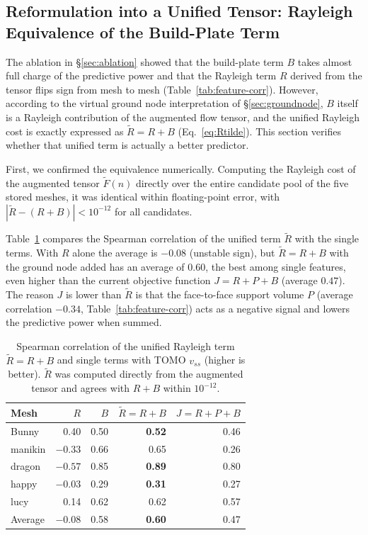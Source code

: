 \documentclass[11pt,a4paper]{article}
\begin{document}
\subsection{Reformulation into a Unified Tensor: Rayleigh Equivalence of the Build-Plate Term}
\label{sec:unified}

The ablation in \S\ref{sec:ablation} showed that the build-plate term $B$ takes almost full charge of the predictive power
and that the Rayleigh term $R$ derived from the tensor flips sign from mesh to mesh (Table~\ref{tab:feature-corr}).
However, according to the virtual ground node interpretation of \S\ref{sec:groundnode}, $B$ itself is a Rayleigh contribution of the augmented flow tensor,
and the unified Rayleigh cost is exactly expressed as $\tilde R=R+B$ (Eq.~\eqref{eq:Rtilde}).
This section verifies whether that unified term is actually a better predictor.

First, we confirmed the equivalence numerically.
Computing the Rayleigh cost of the augmented tensor $\tilde F(n)$ directly over the entire candidate pool of the five stored meshes,
it was identical within floating-point error, with $|\tilde R-(R+B)|<10^{-12}$ for all candidates.

Table~\ref{tab:unified-corr} compares the Spearman correlation of the unified term $\tilde R$ with the single terms.
With $R$ alone the average is $-0.08$ (unstable sign), but
$\tilde R=R+B$ with the ground node added has an average of $0.60$, the best among single features,
even higher than the current objective function $J=R+P+B$ (average $0.47$).
The reason $J$ is lower than $\tilde R$ is that the face-to-face support volume $P$ (average correlation $-0.34$, Table~\ref{tab:feature-corr})
acts as a negative signal and lowers the predictive power when summed.

\begin{table}[H]
\centering
\caption{Spearman correlation of the unified Rayleigh term $\tilde R=R+B$ and single terms with TOMO $v_{ss}$ (higher is better).
$\tilde R$ was computed directly from the augmented tensor and agrees with $R+B$ within $10^{-12}$.}
\label{tab:unified-corr}
\begin{tabular}{lrrrr}
\toprule
Mesh & $R$ & $B$ & $\tilde R=R{+}B$ & $J=R{+}P{+}B$\\
\midrule
Bunny   & 0.40 & 0.50 & \textbf{0.52} & 0.46\\
manikin & $-0.33$ & 0.66 & 0.65 & 0.26\\
dragon  & $-0.57$ & 0.85 & \textbf{0.89} & 0.80\\
happy   & $-0.03$ & 0.29 & \textbf{0.31} & 0.27\\
lucy    & 0.14 & 0.62 & 0.62 & 0.57\\
\midrule
Average    & $-0.08$ & 0.58 & \textbf{0.60} & 0.47\\
\bottomrule
\end{tabular}
\end{table}
\end{document}
